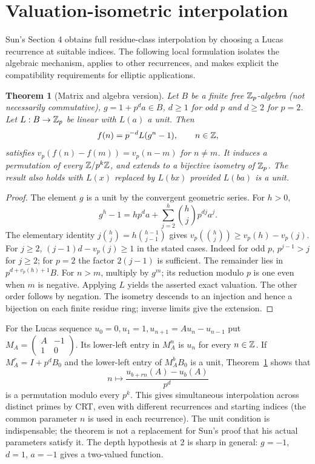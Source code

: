 \documentclass[11pt]{article}
\newtheorem{theorem}{Theorem}[section]
\begin{document}
\section{Valuation-isometric interpolation}\label{sec:interp}
Sun's Section 4 obtains full residue-class interpolation by choosing a
Lucas recurrence at suitable indices. The following local formulation
isolates the algebraic mechanism, applies to other recurrences, and
makes explicit the compatibility requirements for elliptic applications.

\begin{theorem}[Matrix and algebra version]\label{thm:matrix}
Let $B$ be a finite free $\mathbb Z_p$-algebra (not necessarily commutative),
$g=1+p^d a\in B$, $d\ge1$ for odd $p$ and $d\ge2$ for $p=2$.
Let $L:B\to\mathbb Z_p$ be linear with $L(a)$ a unit. Then
\[
 f(n)=p^{-d}L(g^n-1),\qquad n\in\mathbb Z,
\]
satisfies $v_p(f(n)-f(m))=v_p(n-m)$ for $n\ne m$. It induces a
permutation of every $\mathbb Z/p^k\mathbb Z$, and extends to a bijective isometry
of $\mathbb Z_p$. The result also holds with $L(x)$ replaced by $L(bx)$
provided $L(ba)$ is a unit.
\end{theorem}
\begin{proof}
The element $g$ is a unit by the convergent geometric series. For $h>0$,
\[
 g^h-1=h p^d a+\sum_{j=2}^h\binom hj p^{dj}a^j.
\]
The elementary identity $j\binom hj=h\binom{h-1}{j-1}$ gives
$v_p(\binom hj)\ge v_p(h)-v_p(j)$. For $j\ge2$,
$(j-1)d-v_p(j)\ge1$ in the stated cases. Indeed for odd $p$,
$p^{j-1}>j$ for $j\ge2$; for $p=2$ the factor $2(j-1)$ is sufficient.
The remainder lies in $p^{d+v_p(h)+1}B$. For $n>m$, multiply by $g^m$;
its reduction modulo $p$ is one even when $m$ is negative. Applying
$L$ yields the asserted exact valuation. The other order follows by
negation. The isometry descends to an injection and hence a bijection
on each finite residue ring; inverse limits give the extension.
\end{proof}

For the Lucas sequence $u_0=0,u_1=1,u_{n+1}=A u_n-u_{n-1}$ put
$M_A=\left(\begin{smallmatrix}A&-1\\1&0\end{smallmatrix}\right)$.
Its lower-left entry in $M_A^n$ is $u_n$ for every $n\in\mathbb Z$.
If $M_A^r=I+p^d B_0$ and the lower-left entry of $M_A^b B_0$ is a
unit, Theorem~\ref{thm:matrix} shows that
\[
 n\longmapsto \frac{u_{b+rn}(A)-u_b(A)}{p^d}
\]
is a permutation modulo every $p^k$. This gives simultaneous
interpolation across distinct primes by CRT, even with different
recurrences and starting indices (the common parameter $n$ is used in
each recurrence). The unit condition is indispensable; the theorem
is not a replacement for Sun's proof that his actual parameters satisfy
it. The depth hypothesis at 2 is sharp in general: $g=-1$, $d=1$,
$a=-1$ gives a two-valued function.
\end{document}
